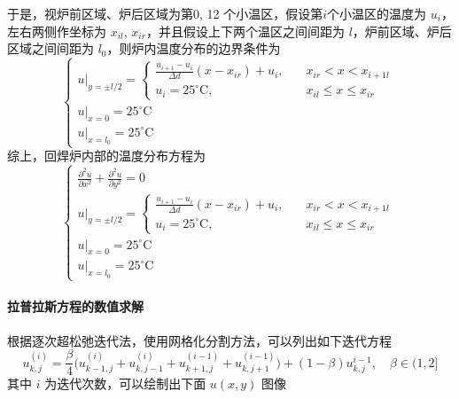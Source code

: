 \documentclass[../main.tex]{subfiles}
\begin{document}
于是，视炉前区域、炉后区域为第\(0\), 12 个小温区，假设第\(i\)个小温区的温度为 \(u_{i}\)，左右两侧作坐标为 \(x_{il}\), \(x_{ir}\)，并且假设上下两个温区之间间距为 \(l\)，炉前区域、炉后区域之间间距为 \(l_{0}\)，则炉内温度分布的边界条件为
\begin{equation}
\begin{cases}
u|_{y = \pm l/2} = 
\begin{cases}
\frac{u_{i+1} - u_{i}}{\varDelta d} (x - x_{ir}) + u_{i} , & \quad x _{ir} < x < x_{i+1 l} \\
u_{i} = 25 ^{\circ}\mathrm{C}, & \quad  x_{il} \le x \le x_{ir} 
\end{cases} \\
u|_{x = 0} = 25 ^{\circ}\mathrm{C}\\
u|_{x = l_{0}} =  25 ^{\circ}\mathrm{C}
\end{cases}
\end{equation}
综上，回焊炉内部的温度分布方程为
\begin{equation}
\begin{cases}
\displaystyle\frac{\partial ^{2} u}{\partial x ^2} + \frac{\partial ^{2} u}{\partial y ^{2}} = 0\\
u|_{y = \pm l/2} = 
\begin{cases}
\displaystyle\frac{u_{i+1} - u_{i}}{\varDelta d} (x - x_{ir}) + u_{i} , & \quad x _{ir} < x < x_{i+1 l} \\
\displaystyle u_{i} = 25 ^{\circ}\mathrm{C}, & \quad  x_{il} \le x \le x_{ir} 
\end{cases} \\
u|_{x = 0} = 25 ^{\circ}\mathrm{C}\\
u|_{x = l_{0}} =  25 ^{\circ}\mathrm{C}
\end{cases}
\end{equation}

\paragraph{拉普拉斯方程的数值求解} 根据逐次超松弛迭代法，使用网格化分割方法，可以列出如下迭代方程
\begin{equation}
u_{k,j} ^{(i)} = \frac{\beta}{4} \bigg( u_{k-1, j} ^{(i)} + u_{k,j-1} ^{(i)} + u_{k+1,j} ^{(i-1)}+ u _{k, j+ 1} ^{(i-1)} \bigg) + (1- \beta) u_{k,j} ^{i-1} ,\quad \beta \in (1, 2]
\end{equation}
其中 \(i\) 为迭代次数，可以绘制出下面 \(u ( x , y)\) 图像
\end{document}
